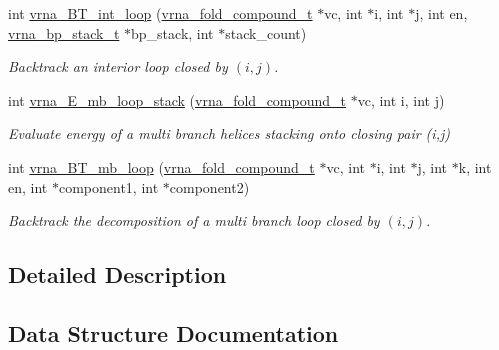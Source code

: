 \begin{DoxyCompactItemize}
\mbox{\label{group__loops_ga849b7dc373b6c0b029672e16a7e52053}} 
int \hyperlink{group__loops_ga849b7dc373b6c0b029672e16a7e52053}{vrna\+\_\+\+B\+T\+\_\+int\+\_\+loop} (\hyperlink{group__fold__compound_ga1b0cef17fd40466cef5968eaeeff6166}{vrna\+\_\+fold\+\_\+compound\+\_\+t} $\ast$vc, int $\ast$i, int $\ast$j, int en, \hyperlink{group__data__structures_gaa651bda42e7692f08cb603cd6834b0ee}{vrna\+\_\+bp\+\_\+stack\+\_\+t} $\ast$bp\+\_\+stack, int $\ast$stack\+\_\+count)
\begin{DoxyCompactList}\small\item\em Backtrack an interior loop closed by $ (i,j) $. \end{DoxyCompactList}\item 
int \hyperlink{group__loops_ga73f048d35475e1d8f50b7d4ac6a2aeb6}{vrna\+\_\+\+E\+\_\+mb\+\_\+loop\+\_\+stack} (\hyperlink{group__fold__compound_ga1b0cef17fd40466cef5968eaeeff6166}{vrna\+\_\+fold\+\_\+compound\+\_\+t} $\ast$vc, int i, int j)
\begin{DoxyCompactList}\small\item\em Evaluate energy of a multi branch helices stacking onto closing pair (i,j) \end{DoxyCompactList}\item 
int \hyperlink{group__loops_ga9cb520ddfd8b3a48089a7910b045d06b}{vrna\+\_\+\+B\+T\+\_\+mb\+\_\+loop} (\hyperlink{group__fold__compound_ga1b0cef17fd40466cef5968eaeeff6166}{vrna\+\_\+fold\+\_\+compound\+\_\+t} $\ast$vc, int $\ast$i, int $\ast$j, int $\ast$k, int en, int $\ast$component1, int $\ast$component2)
\begin{DoxyCompactList}\small\item\em Backtrack the decomposition of a multi branch loop closed by $ (i,j) $. \end{DoxyCompactList}\end{DoxyCompactItemize}


\subsection{Detailed Description}


\subsection{Data Structure Documentation}
\label{structvrna__mx__pf__aux__el__t}
